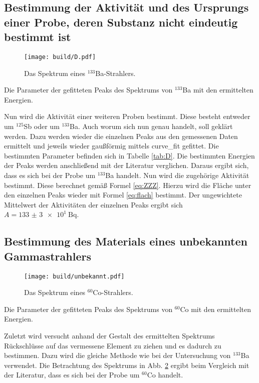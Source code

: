 \subsection{Bestimmung der Aktivität und des Ursprungs einer Probe, deren Substanz nicht eindeutig bestimmt ist}
\begin{figure}
	\centering
	\texttt{[image: build/D.pdf]}
	\caption{Das Spektrum eines $^{133}$Ba-Strahlers.}
	\label{fig:3}
\end{figure}
\begin{table}
	\centering
	\caption{Die Parameter der gefitteten Peaks des Spektrums von $^{133}$Ba mit den ermittelten Energien.}
	
\end{table}
Nun wird die Aktivität einer weiteren Proben bestimmt. Diese besteht entweder um $^{125}$Sb oder um $^{133}$Ba. Auch worum sich nun genau handelt, soll geklärt werden. Dazu werden wieder die einzelnen Peaks aus den gemessenen Daten ermittelt und jeweils wieder gaußförmig mittels curve\_fit \cite{scipy} gefittet. Die bestimmten Parameter befinden sich in Tabelle \ref{tab:D}. Die bestimmten Energien der Peaks werden anschließend mit der Literatur\cite{V18} verglichen. Daraus ergibt sich, dass es sich bei der Probe um $^{133}$Ba handelt. Nun wird die zugehörige Aktivität bestimmt. Diese berechnet gemäß Formel \eqref{eq:ZZZ}. Hierzu wird die Fläche unter den einzelnen Peaks wieder mit Formel \eqref{eq:flach} bestimmt. Der ungewichtete Mittelwert der Aktivitäten der einzelnen Peaks ergibt sich $A = \SI{133(3)e1}{\becquerel}$.


\subsection{Bestimmung des Materials eines unbekannten Gammastrahlers}
\begin{figure}
	\centering
	\texttt{[image: build/unbekannt.pdf]}
	\caption{Das Spektrum eines $^{60}$Co-Strahlers.}
	\label{fig:4}
\end{figure}
\begin{table}
	\centering
	\caption{Die Parameter der gefitteten Peaks des Spektrums von $^{60}$Co mit den ermittelten Energien.}
	
\end{table}
Zuletzt wird versucht anhand der Gestalt des ermittelten Spektrums Rückschlüsse auf das vermessene Element zu ziehen und es dadurch zu bestimmen. Dazu wird die gleiche Methode wie bei der Untersuchung von $^{133}$Ba verwendet. Die Betrachtung des Spektrums in Abb. \ref{fig:4} ergibt beim Vergleich mit der Literatur\cite{Co60}, dass es sich bei der Probe um $^{60}$Co handelt.%
